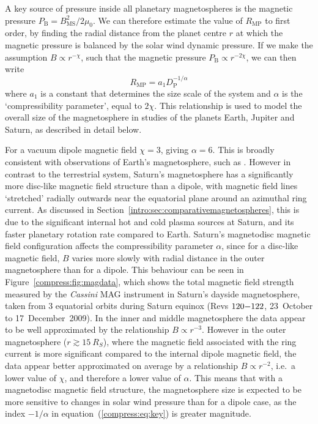A key source of pressure inside all planetary magnetospheres is the magnetic pressure $P_\mathrm{B}=B_\mathrm{MS}^2/2\mu_0$. We can therefore estimate the value of $R_\mathrm{MP}$ to first order, by finding the radial distance from the planet centre $r$ at which the magnetic pressure is balanced by the solar wind dynamic pressure. If we make the assumption $B \propto r^{-\chi}$, such that the magnetic pressure $P_\mathrm{B} \propto r^{-2\chi}$, we can then write
\begin{equation}\label{compress:eq:key}
R_\mathrm{MP}=a_1D_\mathrm{P}^{-1/\alpha}
\end{equation}
where $a_1$ is a constant that determines the size scale of the system and $\alpha$ is the `compressibility parameter', equal to $2\chi$. This relationship is used to model the overall size of the magnetosphere in studies of the planets Earth, Jupiter and Saturn, as described in detail below. 

For a vacuum dipole magnetic field $\chi=3$, giving $\alpha=6$. This is broadly consistent with observations of Earth's magnetosphere, such as \citet{shue1997}. However in contrast to the terrestrial system, Saturn's magnetosphere has a significantly more disc-like magnetic field structure than a dipole, with magnetic field lines `stretched' radially outwards near the equatorial plane around an azimuthal ring current. As discussed in Section~\ref{intro:sec:comparativemagnetospheres}, this is due to the significant internal hot and cold plasma sources at Saturn, and its faster planetary rotation rate compared to Earth. Saturn's magnetodisc magnetic field configuration affects the compressibility parameter $\alpha$, since for a disc-like magnetic field, $B$ varies more slowly with radial distance in the outer magnetosphere than for a dipole. This behaviour can be seen in Figure~\ref{compress:fig:magdata}, which shows the total magnetic field strength measured by the \textit{Cassini} MAG instrument in Saturn's dayside magnetosphere, taken from 3 equatorial orbits during Saturn equinox (Revs $120{\--}122$, 23~October to 17~December~2009). In the inner and middle magnetosphere the data appear to be well approximated by the relationship $B \propto r^{-3}$. However in the outer magnetosphere ($r \gtrsim \SI{15}{R_S}$), where the magnetic field associated with the ring current is more significant compared to the internal dipole magnetic field, the data appear better approximated on average by a relationship $B \propto r^{-2}$, i.e.\ a lower value of $\chi$, and therefore a lower value of $\alpha$. This means that with a magnetodisc magnetic field structure, the magnetosphere size is expected to be more sensitive to changes in solar wind pressure than for a dipole case, as the index $-1/\alpha$ in equation~(\ref{compress:eq:key}) is greater magnitude.


